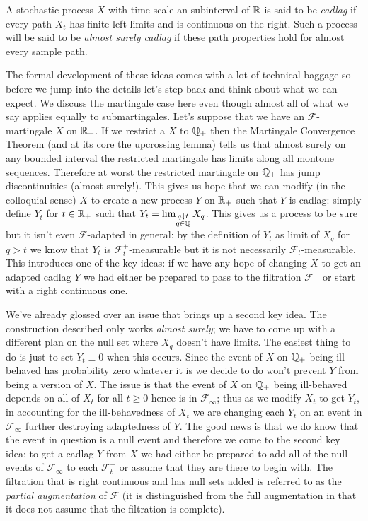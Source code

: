 \begin{defn}A stochastic process $X$ with time scale an subinterval of
  $\mathbb{R}$ is said to be \emph{cadlag} if every path $X_t$ has finite
  left limits and is continuous on the right.  Such a process will be
  said to be \emph{almost surely cadlag} if these path properties hold for
  almost every sample path.
\end{defn}

The formal development of these ideas comes with a lot of technical
baggage so before we jump into the details let's step
back and think about what we can expect.  We discuss the martingale
case here even though almost all of what we say applies equally to
submartingales.  Let's suppose that we have an
$\mathcal{F}$-martingale $X$ on $\mathbb{R}_+$.  If we restrict a
$X$ to $\mathbb{Q}_+$ then the Martingale Convergence
Theorem (and at its core the upcrossing lemma) tells us that
almost surely on
any bounded interval the restricted martingale has limits along all
montone sequences.  Therefore at worst the restricted martingale on
$\mathbb{Q}_+$ has jump discontinuities (almost surely!).  This gives us hope that we
can modify (in the colloquial sense) $X$ to create a new process $Y$
on $\mathbb{R}_+$ such that $Y$ is cadlag: simply define $Y_t$ for $t \in
\mathbb{R}_+$ such that $Y_t =
\lim_{\substack{q\downarrow t \\ q \in \mathbb{Q}}} X_q$.  This gives
us a process to be sure but it isn't even $\mathcal{F}$-adapted in
general: by the definition of $Y_t$ as limit of $X_q$ for $q > t$  we know that $Y_t$ is
$\mathcal{F}^+_t$-measurable but it is not necessarily $\mathcal{F}_t$-measurable.  This
introduces one of the key ideas: if we have any hope of  changing $X$
to get an adapted cadlag $Y$ we had
either be prepared to pass to the filtration $\mathcal{F}^+$ or start
with a right continuous one.  

We've already glossed over an issue that brings up a second key idea.
The construction described only works \emph{almost surely}; we have to
come up with a different plan on the null set where $X_q$ doesn't have
limits.  The easiest thing
to do is just to set $Y_t \equiv 0$ when this occurs.  Since the event
of $X$ on $\mathbb{Q}_+$ being ill-behaved has probability zero whatever it is we decide
to do won't prevent $Y$ from being a version of $X$.  The issue is that
the event of $X$ on $\mathbb{Q}_+$ being ill-behaved depends on all of
$X_t$ for all $t \geq 0$ hence is in $\mathcal{F}_\infty$; thus as we
modify $X_t$ to get $Y_t$, in accounting for the ill-behavedness of $X_t$
we are changing each $Y_t$ on an event in $\mathcal{F}_\infty$ further
destroying adaptedness of $Y$.  The good news is that we do know that
the event in question is a null event and therefore we come to the
second key idea: to get a cadlag $Y$ from $X$ we had either be
prepared to add all of the null events of $\mathcal{F}_\infty$ to each
$\mathcal{F}^+_t$ or assume that they are there to begin with.  The
filtration that is right continuous and has null sets added is
referred to as the \emph{partial augmentation} of $\mathcal{F}$ (it is
distinguished from the full augmentation in that it does not assume
that the filtration is complete).

